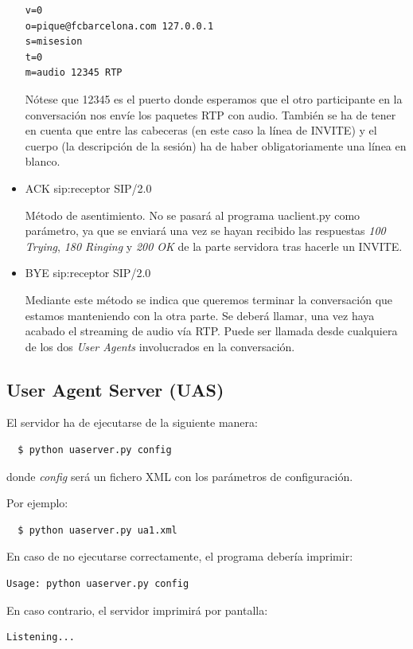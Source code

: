 \documentclass[a4paper,11pt]{article}
\begin{document}
\begin{itemize}
\begin{verbatim}
v=0
o=pique@fcbarcelona.com 127.0.0.1
s=misesion
t=0
m=audio 12345 RTP
\end{verbatim}

Nótese que 12345 es el puerto donde esperamos que el otro participante en la conversación nos envíe los paquetes RTP con audio. También se ha de tener en cuenta que entre las cabeceras (en este caso la línea de INVITE) y el cuerpo (la descripción de la sesión) ha de haber obligatoriamente una línea en blanco.

    \item ACK sip:receptor SIP/2.0

    Método de asentimiento. No se pasará al programa uaclient.py como parámetro, ya que se enviará una vez se hayan recibido las respuestas \emph{100 Trying}, \emph{180 Ringing} y \emph{200 OK} de la parte servidora tras hacerle un INVITE.

    \item BYE sip:receptor SIP/2.0

    Mediante este método se indica que queremos terminar la conversación que estamos manteniendo con la otra parte. Se deberá llamar, una vez haya acabado el streaming de audio vía RTP. Puede ser llamada desde cualquiera de los dos \emph{User Agents} involucrados en la conversación.

  \end{itemize}


\subsection{User Agent Server (UAS)}

El servidor ha de ejecutarse de la siguiente manera:
\begin{verbatim}
  $ python uaserver.py config
\end{verbatim}

donde \emph{config} será un fichero XML con los parámetros de configuración.

Por ejemplo:
\begin{verbatim}
  $ python uaserver.py ua1.xml
\end{verbatim}

En caso de no ejecutarse correctamente, el programa debería imprimir:
\begin{verbatim}
Usage: python uaserver.py config
\end{verbatim}

En caso contrario, el servidor imprimirá por pantalla:
\begin{verbatim}
Listening...
\end{verbatim}
\end{document}
